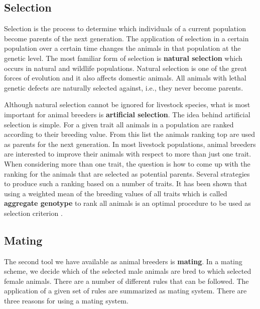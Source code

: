 \documentclass[
]{book}
\theoremstyle{definition}
\theoremstyle{definition}
\theoremstyle{definition}
\theoremstyle{remark}
\begin{document}
\hypertarget{selection}{%
\subsection{Selection}\label{selection}}

Selection is the process to determine which individuals of a current population become parents of the next generation. The application of selection in a certain population over a certain time changes the animals in that population at the genetic level. The most familiar form of selection is \textbf{natural selection} which occurs in natural and wildlife populations. Natural selection is one of the great forces of evolution and it also affects domestic animals. All animals with lethal genetic defects are naturally selected against, i.e., they never become parents.

Although natural selection cannot be ignored for livestock species, what is most important for animal breeders is \textbf{artificial selection}. The idea behind artificial selection is simple. For a given trait all animals in a population are ranked according to their breeding value. From this list the animals ranking top are used as parents for the next generation. In most livestock populations, animal breeders are interested to improve their animals with respect to more than just one trait. When considering more than one trait, the question is how to come up with the ranking for the animals that are selected as potential parents. Several strategies to produce such a ranking based on a number of traits. It has been shown that using a weighted mean of the breeding values of all traits which is called \textbf{aggregate genotype} to rank all animals is an optimal procedure to be used as selection criterion \citep{Hazel1943}.

\hypertarget{mating}{%
\subsection{Mating}\label{mating}}

The second tool we have available as animal breeders is \textbf{mating}. In a mating scheme, we decide which of the selected male animals are bred to which selected female animals. There are a number of different rules that can be followed. The application of a given set of rules are summarized as mating system. There are three reasons for using a mating system.
\end{document}
